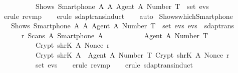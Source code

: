 \begin{isabellebody}
  \ \ \ \ \ \ \ \ \ \ Shows\ {\isacharparenleft}Smartphone\ A{\isacharparenright}\ A\ {\isasymlbrace}Agent\ A{\isacharcomma}\ Number\ T{\isasymrbrace}\ {\isasymin}\ set\ evs{\isacharparenright}{\isachardoublequoteclose}\isanewline
  \isadelimproof
  \isanewline
  \ \ %
  \endisadelimproof
  \isatagproof
  \isamarkupfalse%
  \ {\isacharparenleft}erule\ rev{\isacharunderscore}mp{\isacharparenright}\isanewline
  \ \ \isamarkupfalse%
  \ {\isacharparenleft}erule\ sdaptrans{\isachardot}induct{\isacharparenright}\isanewline
  \ \ \isamarkupfalse%
  \ {\isacharparenleft}auto{\isacharparenright}\isanewline
  \isamarkupfalse%
  \endisatagproof
  {\isafoldproof}%
  \isadelimproof
  \endisadelimproof
  \isadelimdocument
  \endisadelimdocument
  \isatagdocument
  \isamarkuptrue%
  \endisatagdocument
  {\isafolddocument}%
  \isadelimdocument
  \endisadelimdocument
  \isamarkupfalse%
  \ Shows{\isacharunderscore}which{\isacharunderscore}Smartphone{\isacharunderscore}{}\ {\isacharcolon}\isanewline
  \ \ {\isachardoublequoteopen}{\isasymlbrakk}\ Shows\ {\isacharparenleft}Smartphone\ A{\isacharparenright}\ A\ {\isasymlbrace}Agent\ A{\isacharcomma}\ Number\ T{\isasymrbrace}\ {\isasymin}\ set\ evs{\isacharsemicolon}\ evs\ {\isasymin}\ sdaptrans\ {\isasymrbrakk}\isanewline
  \ \ \ \ {\isasymLongrightarrow}\ {\isacharparenleft}{\isasymexists}\ r{\isachardot}\ Scans\ A\ {\isacharparenleft}Smartphone\ A{\isacharparenright}\ {\isasymlbrace}\isanewline
  \ \ \ \ \ \ \ \ \ \ {\isasymlbrace}Agent\ A{\isacharcomma}\ Number\ T{\isasymrbrace}{\isacharcomma}\isanewline
  \ \ \ \ \ \ \ \ \ \ Crypt\ {\isacharparenleft}shrK\ A{\isacharparenright}\ {\isacharparenleft}Nonce\ r{\isacharparenright}{\isacharcomma}\isanewline
  \ \ \ \ \ \ \ \ \ \ Crypt\ {\isacharparenleft}shrK\ A{\isacharparenright}\ {\isasymlbrace}\ {\isasymlbrace}Agent\ A{\isacharcomma}\ Number\ T{\isasymrbrace}{\isacharcomma}\ Crypt\ {\isacharparenleft}shrK\ A{\isacharparenright}\ {\isacharparenleft}Nonce\ r{\isacharparenright}{\isasymrbrace}\isanewline
  \ \ \ \ \ \ \ \ {\isasymrbrace}\ {\isasymin}\ set\ evs{\isacharparenright}{\isachardoublequoteclose}\isanewline
  \isadelimproof
  \isanewline
  \ \ %
  \endisadelimproof
  \isatagproof
  \isamarkupfalse%
  \ {\isacharparenleft}erule\ rev{\isacharunderscore}mp{\isacharparenright}\isanewline
  \ \ \isamarkupfalse%
  \ {\isacharparenleft}erule\ sdaptrans{\isachardot}induct{\isacharparenright}\isanewline

\end{isabellebody}
